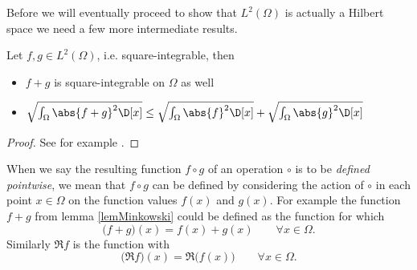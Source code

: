 \pagebreak[2]
\noindent
Before we will eventually proceed to show that $L^2(\Omega)$ is actually a Hilbert space we need a few more intermediate results.
\begin{lem}
	\label{lemMinkowski}
	Let $f,g \in L^2(\Omega)$, i.e. square-integrable, then
	\begin{itemize}
		\item $f + g$ is square-integrable on $\Omega$ as well
		\item $\sqrt{\int_\Omega \abs{f + g}^2 \D[x]} \le \sqrt{\int_\Omega \abs{f}^2 \D[x]} + \sqrt{\int_\Omega \abs{g}^2 \D[x]}$
	\end{itemize}
\end{lem}
\begin{proof}
	See for example \cite{Adams2003}.
\end{proof}

\begin{nte}
	When we say the resulting function $f \circ g$ of an operation $\circ$ is to be \emph{defined pointwise},
	we mean that $f\circ g$ can be defined by considering the action of $\circ$ in each point $x \in \Omega$ on the function values $f(x)$ and $g(x)$.
	For example the function $f+g$ from lemma \ref{lemMinkowski} could be defined as the function for which
	\[ \Big(f+g\Big)(x) = f(x) + g(x) \qquad \forall x \in \Omega.\]
	Similarly $\Re f$ is the function with
	\[ \Big( \Re f \Big)(x) = \Re \Big( f(x) \Big) \qquad \forall x \in \Omega.\]
\end{nte}

